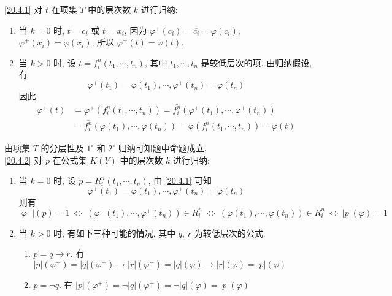 \documentclass[boxes]{homework}
\begin{document}
\begin{solution}
    \ref{20.4.1} 对 $t$ 在项集 $T$ 中的层次数 $k$ 进行归纳:
    \begin{enumerate}[label = $\arabic*^\circ$, parsep = 0pt, itemsep = 0pt, topsep = 0em]
        \item 当 $k = 0$ 时, $t = c_i$ 或 $t = x_i$, 因为 $\varphi^+(c_i) = \overline{c_i} = \varphi(c_i)$, $\varphi^+(x_i)=\varphi(x_i)$, 所以 $\varphi^+(t) = \varphi(t)$.
        \item 当 $k > 0$ 时, 设 $t = f_i^n(t_1, \cdots, t_n)$, 其中 $t_1, \cdots, t_n$ 是较低层次的项. 由归纳假设, 有
              $$
                  \varphi^+(t_1) = \varphi(t_1), \cdots, \varphi^+(t_n) = \varphi(t_n)
              $$
              因此
              \begin{align*}
                  \varphi^+(t) & = \varphi^+(f_i^n(t_1, \cdots, t_n)) = \overline{f_i^n}(\varphi^+(t_1), \cdots, \varphi^+(t_n))        \\
                               & = \overline{f_i^n}(\varphi(t_1), \cdots, \varphi(t_n)) = \varphi(f_i^n(t_1, \cdots, t_n)) = \varphi(t)
              \end{align*}
    \end{enumerate}
    由项集 $T$ 的分层性及 $1^\circ$ 和 $2^\circ$ 归纳可知题中命题成立.
    \\
    \ref{20.4.2} 对 $p$ 在公式集 $K(Y)$ 中的层次数 $k$ 进行归纳:
    \begin{enumerate}[label = $\arabic*^\circ$, parsep = 0pt, itemsep = 0pt, topsep = .1em]
        \item 当 $k = 0$ 时, 设 $p = R_i^n(t_1, \cdots, t_n)$, 由 \ref{20.4.1} 可知
        $$
            \varphi^+(t_1) = \varphi(t_1), \cdots, \varphi^+(t_n) = \varphi(t_n)
        $$
        则有
        $$
            \lvert\varphi^+\rvert(p) = 1\ \Leftrightarrow\ (\varphi^+(t_1), \cdots, \varphi^+(t_n))\in R_i^n\ \Leftrightarrow\ (\varphi(t_1), \cdots, \varphi(t_n))\in R_i^n\ \Leftrightarrow\ \lvert p\rvert(\varphi) = 1
        $$
        \item 当 $k > 0$ 时, 有如下三种可能的情况, 其中 $q$, $r$ 为较低层次的公式.
        \begin{enumerate}[label = (\arabic*), parsep = 0pt, itemsep = 0pt, topsep = .1em]
            \item $p = q\to r$. 有 $\lvert p\rvert(\varphi^+) = \lvert q\rvert(\varphi^+)\to \lvert r\rvert(\varphi^+) =\lvert q\rvert(\varphi)\to \lvert r\rvert(\varphi) = \lvert p\rvert(\varphi)$
            \item $p = \lnot q$. 有 $\lvert p\rvert(\varphi^+) = \lnot \lvert q\rvert(\varphi^+) = \lnot \lvert q\rvert(\varphi) = \lvert p\rvert(\varphi)$

\end{enumerate}
\end{enumerate}
\end{solution}
\end{document}

